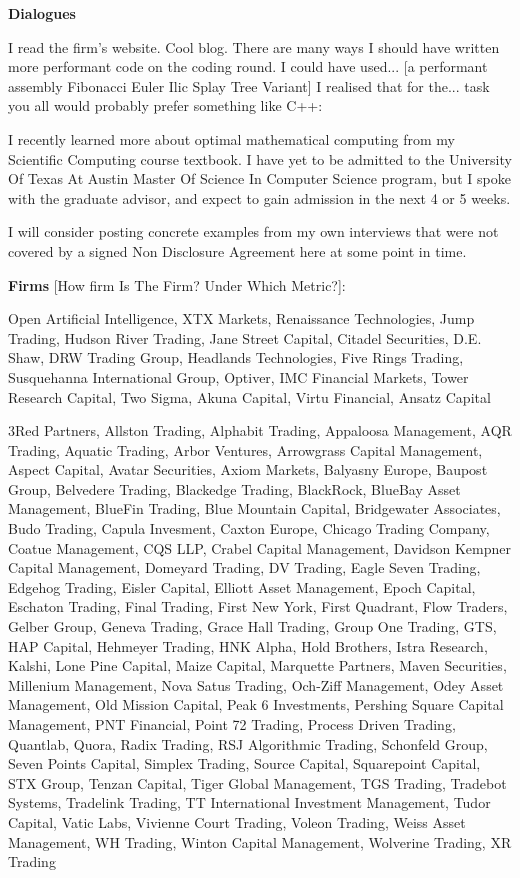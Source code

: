 \newpage

\textbf{Dialogues}

I read the firm's website. Cool blog. There are many ways I should have written more performant code on the coding round. I could have used... [a performant assembly Fibonacci Euler Ilic Splay Tree Variant] I realised that for the... task you all would probably prefer something like C++:

I recently learned more about optimal mathematical computing from my Scientific Computing course textbook. I have yet to be admitted to the University Of Texas At Austin Master Of Science In Computer Science program, but I spoke with the graduate advisor, and expect to gain admission in the next 4 or 5 weeks.

I will consider posting concrete examples from my own interviews that were not covered by a signed Non Disclosure Agreement here at some point in time.

\newpage

\textbf{Firms} [How firm Is The Firm? Under Which Metric?]:

Open Artificial Intelligence, XTX Markets, Renaissance Technologies, Jump Trading, Hudson River Trading, Jane Street Capital, Citadel Securities, D.E. Shaw, DRW Trading Group, Headlands Technologies, Five Rings Trading, Susquehanna International Group, Optiver, IMC Financial Markets, Tower Research Capital, Two Sigma, Akuna Capital, Virtu Financial, Ansatz Capital

3Red Partners, Allston Trading, Alphabit Trading, Appaloosa Management, AQR Trading, Aquatic Trading, Arbor Ventures, Arrowgrass Capital Management, Aspect Capital, Avatar Securities, Axiom Markets, Balyasny Europe, Baupost Group, Belvedere Trading, Blackedge Trading, BlackRock, BlueBay Asset Management, BlueFin Trading, Blue Mountain Capital, Bridgewater Associates, Budo Trading, Capula Invesment, Caxton Europe, Chicago Trading Company, Coatue Management, CQS LLP, Crabel Capital Management, Davidson Kempner Capital Management, Domeyard Trading, DV Trading, Eagle Seven Trading, Edgehog Trading, Eisler Capital, Elliott Asset Management, Epoch Capital, Eschaton Trading, Final Trading, First New York, First Quadrant, Flow Traders, Gelber Group, Geneva Trading, Grace Hall Trading, Group One Trading, GTS, HAP Capital, Hehmeyer Trading, HNK Alpha, Hold Brothers, Istra Research, Kalshi, Lone Pine Capital, Maize Capital, Marquette Partners, Maven Securities, Millenium Management, Nova Satus Trading, Och-Ziff Management, Odey Asset Management, Old Mission Capital, Peak 6 Investments, Pershing Square Capital Management, PNT Financial, Point 72 Trading, Process Driven Trading, Quantlab, Quora, Radix Trading, RSJ Algorithmic Trading, Schonfeld Group, Seven Points Capital, Simplex Trading, Source Capital, Squarepoint Capital, STX Group, Tenzan Capital, Tiger Global Management, TGS Trading, Tradebot Systems, Tradelink Trading, TT International Investment Management, Tudor Capital, Vatic Labs, Vivienne Court Trading, Voleon Trading, Weiss Asset Management, WH Trading, Winton Capital Management, Wolverine Trading, XR Trading

